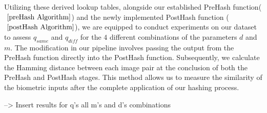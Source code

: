 Utilizing these derived lookup tables, alongside our established PreHash function(\(~\ref{preHash Algorithm}\)) and the newly implemented PostHash function (\(~\ref{postHash Algorithm}\)), we are equipped to conduct experiments on our dataset to assess \(q_{same}\) and \(q_{diff}\) for the \(4\) different combinations of the parameters \(d\) and \(m\). The modification in our pipeline involves passing the output from the PreHash function directly into the PostHash function. Subsequently, we calculate the Hamming distance between each image pair at the conclusion of both the PreHash and PostHash stages. This method allows us to measure the similarity of the biometric inputs after the complete application of our hashing process.

--> Insert results for q's all m's and d's combinations



